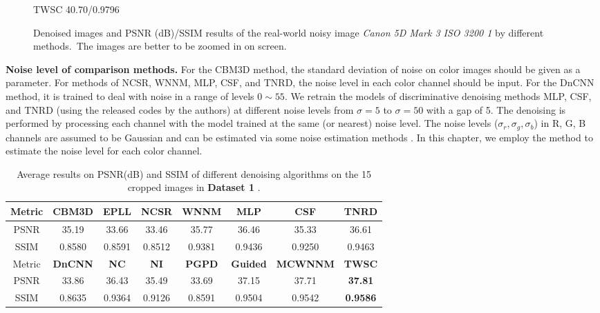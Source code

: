 \begin{figure}
{\begin{minipage}[t]{0.24\textwidth}
{\footnotesize TWSC 40.70/0.9796}
\end{minipage}
}\vspace{-3mm}
    \caption{Denoised images and PSNR (dB)/SSIM results of the real-world noisy image \textsl{Canon 5D Mark 3 ISO 3200 1} \cite{crosschannel2016} by different methods.\ The images are better to be zoomed in on screen.}
    \label{fig6-5}
\end{figure}

\textbf{Noise level of comparison methods.} For the CBM3D method, the standard deviation of noise on color images should be given as a parameter. For methods of NCSR,  WNNM, MLP, CSF, and TNRD, the noise level in each color channel should be input. For the DnCNN method, it is trained to deal with noise in a range of levels $0\sim55$. We retrain the models of discriminative denoising methods MLP, CSF, and TNRD (using the released codes by the authors) at different noise levels from $\sigma=5$ to $\sigma=50$ with a gap of 5. The denoising is performed by processing each channel with the model trained at the same (or nearest) noise level. The noise levels ($\sigma_{r}, \sigma_{g}, \sigma_{b}$) in R, G, B channels are assumed to be Gaussian and can be estimated via some noise estimation methods \cite{noiselevel,Chen2015ICCV}. In this chapter, we employ the method \cite{noiselevel} to estimate the noise level for each color channel.


\begin{table}[t!]
\caption{Average results on PSNR(dB) and SSIM of different denoising algorithms on the 15 cropped images in \textbf{Dataset 1} \cite{crosschannel2016}.}
\scriptsize
\label{tab6-6}
\begin{center}
\renewcommand\arraystretch{1.2}
\begin{tabular*}{1\textwidth}{@{\extracolsep{\fill}}cccccccc}
\hline
Metric
&
\textbf{CBM3D}
&
\textbf{EPLL}
&
\textbf{NCSR}
&
\textbf{WNNM}
&
\textbf{MLP}
&
\textbf{CSF}
&
\textbf{TNRD}
\\
\hline
PSNR & 35.19  & 33.66 & 33.46 &  35.77 &  36.46 & 35.33 & 36.61  
\\
\hline
SSIM & 0.8580 & 0.8591  & 0.8512 & 0.9381 &  0.9436  & 0.9250 & 0.9463 
\\
\hline
Metric
&
\textbf{DnCNN}
&
\textbf{NC}
&
\textbf{NI}
&
\textbf{PGPD}
&
\textbf{Guided}
&
\textbf{MCWNNM}
&
\textbf{TWSC}
\\
\hline
PSNR &  33.86  & 36.43  & 35.49  & 33.69  &  37.15 &  37.71 &  \textbf{37.81}
\\
\hline
SSIM & 0.8635  &  0.9364 & 0.9126  & 0.8591  & 0.9504 &  0.9542 & \textbf{0.9586}
\\
\hline
\end{tabular*}
\end{center}
\end{table}


